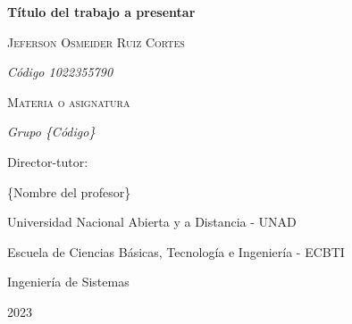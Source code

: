 \begin{titlepage}
	\centering
	{\bfseries\LARGE Título del trabajo a presentar\par}
	\vspace{3cm}
	{\scshape\LARGE Jeferson Osmeider Ruiz Cortes \par}
	{\itshape\Large C\'odigo 1022355790 \par}
	\vspace{2cm}
	{\scshape\Large Materia o asignatura \par}
	{\itshape\Large Grupo \{Código\} \par}
	\vspace{3cm}
	{\Large Director-tutor: \par}
	{\Large \{Nombre del profesor\}  \par}
	\vspace{2cm}
	{\Large Universidad Nacional Abierta y a Distancia - UNAD \par
	Escuela de Ciencias Básicas, Tecnología e Ingeniería - ECBTI\par
	Ingeniería de Sistemas}
	{\Large 2023 \par}
\end{titlepage}